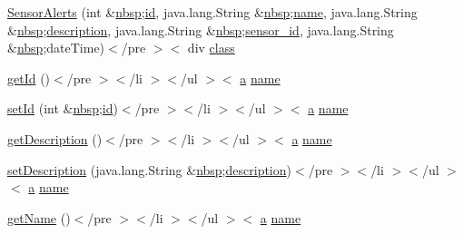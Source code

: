 \begin{DoxyCompactItemize}
\hyperlink{_sensor_alerts_8html_ac691cf05ae7452a5438b3270e632a414}{Sensor\-Alerts} (int \&\hyperlink{_tools_8html_aef915316f784c9063d942974538301a6}{nbsp};\hyperlink{index-9_8html_aa9b8ff1d03b739d1e752b9d9a5aa7c98}{id}, java.\-lang.\-String \&\hyperlink{_tools_8html_aef915316f784c9063d942974538301a6}{nbsp};\hyperlink{_cloudia_d_b_8html_ab74e6bf80237ddc4109968cedc58c151}{name}, java.\-lang.\-String \&\hyperlink{_tools_8html_aef915316f784c9063d942974538301a6}{nbsp};\hyperlink{_cloudia_d_b_8html_a2661f439a4a94ffdcd5e47ae1da0bb1d}{description}, java.\-lang.\-String \&\hyperlink{_tools_8html_aef915316f784c9063d942974538301a6}{nbsp};\hyperlink{_my_s_q_l_connector_8measure_8html_a48a4081a48bf69abc4ba5d704ec33919}{sensor\-\_\-id}, java.\-lang.\-String \&\hyperlink{_tools_8html_aef915316f784c9063d942974538301a6}{nbsp};date\-Time)$<$/pre $>$$<$ div \hyperlink{_tools_8html_acf06f836132665ba8114f5a414c2403f}{class}
\item 
\hyperlink{_sensor_alerts_8html_ace07d5ebb17440045570584549a5d866}{get\-Id} ()$<$/pre $>$$<$/li $>$$<$/ul $>$$<$ \hyperlink{style_8css_a5e8981582017bb8b84c21f148345d1f7}{a} \hyperlink{_cloudia_d_b_8html_ab74e6bf80237ddc4109968cedc58c151}{name}
\item 
\hyperlink{_sensor_alerts_8html_aebddb8425fd0565ce88cdffe074ef4da}{set\-Id} (int \&\hyperlink{_tools_8html_aef915316f784c9063d942974538301a6}{nbsp};\hyperlink{index-9_8html_aa9b8ff1d03b739d1e752b9d9a5aa7c98}{id})$<$/pre $>$$<$/li $>$$<$/ul $>$$<$ \hyperlink{style_8css_a5e8981582017bb8b84c21f148345d1f7}{a} \hyperlink{_cloudia_d_b_8html_ab74e6bf80237ddc4109968cedc58c151}{name}
\item 
\hyperlink{_sensor_alerts_8html_aac45e82e91682a04ce44d494e5688c27}{get\-Description} ()$<$/pre $>$$<$/li $>$$<$/ul $>$$<$ \hyperlink{style_8css_a5e8981582017bb8b84c21f148345d1f7}{a} \hyperlink{_cloudia_d_b_8html_ab74e6bf80237ddc4109968cedc58c151}{name}
\item 
\hyperlink{_sensor_alerts_8html_af691e1edabb743c7f8daf2667fff263e}{set\-Description} (java.\-lang.\-String \&\hyperlink{_tools_8html_aef915316f784c9063d942974538301a6}{nbsp};\hyperlink{_cloudia_d_b_8html_a2661f439a4a94ffdcd5e47ae1da0bb1d}{description})$<$/pre $>$$<$/li $>$$<$/ul $>$$<$ \hyperlink{style_8css_a5e8981582017bb8b84c21f148345d1f7}{a} \hyperlink{_cloudia_d_b_8html_ab74e6bf80237ddc4109968cedc58c151}{name}
\item 
\hyperlink{_sensor_alerts_8html_a7c04a548f7272c12fb8bfdd44724aaaa}{get\-Name} ()$<$/pre $>$$<$/li $>$$<$/ul $>$$<$ \hyperlink{style_8css_a5e8981582017bb8b84c21f148345d1f7}{a} \hyperlink{_cloudia_d_b_8html_ab74e6bf80237ddc4109968cedc58c151}{name}

\end{DoxyCompactItemize}
